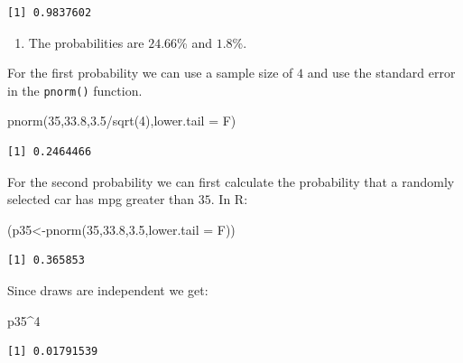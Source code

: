 \documentclass[
  letterpaper,
  DIV=11,
  numbers=noendperiod]{scrreprt}
\newenvironment{Shaded}{\begin{snugshade}}{\end{snugshade}}
\newcommand{\AttributeTok}[1]{\textcolor[rgb]{0.40,0.45,0.13}{#1}}
\newcommand{\DecValTok}[1]{\textcolor[rgb]{0.68,0.00,0.00}{#1}}
\newcommand{\FloatTok}[1]{\textcolor[rgb]{0.68,0.00,0.00}{#1}}
\newcommand{\FunctionTok}[1]{\textcolor[rgb]{0.28,0.35,0.67}{#1}}
\newcommand{\NormalTok}[1]{\textcolor[rgb]{0.00,0.23,0.31}{#1}}
\newcommand{\OtherTok}[1]{\textcolor[rgb]{0.00,0.23,0.31}{#1}}
\newcommand{\SpecialCharTok}[1]{\textcolor[rgb]{0.37,0.37,0.37}{#1}}
\providecommand{\tightlist}{%
  \setlength{\itemsep}{0pt}\setlength{\parskip}{0pt}}\usepackage{longtable,booktabs,array}
\begin{document}
\begin{verbatim}
[1] 0.9837602
\end{verbatim}

\begin{enumerate}
\def\labelenumi{\arabic{enumi}.}
\setcounter{enumi}{1}
\tightlist
\item
  The probabilities are \(24.66\)\% and \(1.8\)\%.
\end{enumerate}

For the first probability we can use a sample size of \(4\) and use the
standard error in the \texttt{pnorm()} function.

\begin{Shaded}
\begin{Highlighting}[numbers=left,,]
\FunctionTok{pnorm}\NormalTok{(}\DecValTok{35}\NormalTok{,}\FloatTok{33.8}\NormalTok{,}\FloatTok{3.5}\SpecialCharTok{/}\FunctionTok{sqrt}\NormalTok{(}\DecValTok{4}\NormalTok{),}\AttributeTok{lower.tail =}\NormalTok{ F)}
\end{Highlighting}
\end{Shaded}

\begin{verbatim}
[1] 0.2464466
\end{verbatim}

For the second probability we can first calculate the probability that a
randomly selected car has mpg greater than \(35\). In R:

\begin{Shaded}
\begin{Highlighting}[numbers=left,,]
\NormalTok{(p35}\OtherTok{\textless{}{-}}\FunctionTok{pnorm}\NormalTok{(}\DecValTok{35}\NormalTok{,}\FloatTok{33.8}\NormalTok{,}\FloatTok{3.5}\NormalTok{,}\AttributeTok{lower.tail =}\NormalTok{ F))}
\end{Highlighting}
\end{Shaded}

\begin{verbatim}
[1] 0.365853
\end{verbatim}

Since draws are independent we get:

\begin{Shaded}
\begin{Highlighting}[numbers=left,,]
\NormalTok{p35}\SpecialCharTok{\^{}}\DecValTok{4}
\end{Highlighting}
\end{Shaded}

\begin{verbatim}
[1] 0.01791539
\end{verbatim}
\end{document}
